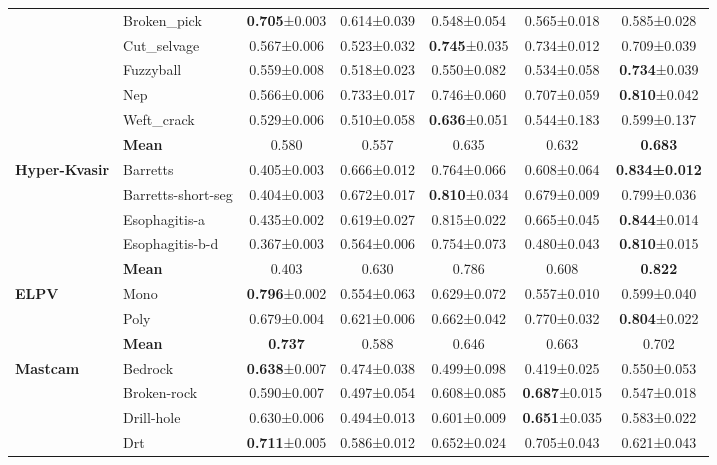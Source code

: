 \documentclass[10pt,journal,compsoc]{IEEEtran}
\begin{document}
\begin{table}[bt]
{\begin{tabular}{l@{}l@{}ccccc}
          & Broken\_pick & \textbf{0.705}±0.003 & 0.614±0.039 & 0.548±0.054 & 0.565±0.018 & 0.585±0.028 \\
          & Cut\_selvage & 0.567±0.006 & 0.523±0.032 & \textbf{0.745}±0.035 & 0.734±0.012 & 0.709±0.039 \\
          & Fuzzyball & 0.559±0.008 & 0.518±0.023 & 0.550±0.082 & 0.534±0.058 & \textbf{0.734}±0.039 \\
          & Nep   & 0.566±0.006 & 0.733±0.017 & 0.746±0.060 & 0.707±0.059 & \textbf{0.810}±0.042 \\
          & Weft\_crack & 0.529±0.006 & 0.510±0.058 & \textbf{0.636}±0.051 & 0.544±0.183 & 0.599±0.137 \\\cline{2-7}
          & \textbf{Mean}  & 0.580 & 0.557 & 0.635 & 0.632 & \textbf{0.683} \\
    \hline
    \multirow{5}[0]{*}{\textbf{Hyper-Kvasir}} & Barretts & 0.405±0.003 & 0.666±0.012 & 0.764±0.066 & 0.608±0.064 & \textbf{0.834±0.012} \\
          & Barretts-short-seg & 0.404±0.003 & 0.672±0.017 & \textbf{0.810}±0.034 & 0.679±0.009 & 0.799±0.036 \\
          & Esophagitis-a & 0.435±0.002 & 0.619±0.027 & 0.815±0.022 & 0.665±0.045 & \textbf{0.844}±0.014 \\
          & Esophagitis-b-d & 0.367±0.003 & 0.564±0.006 & 0.754±0.073 & 0.480±0.043 & \textbf{0.810}±0.015 \\\cline{2-7}
          & \textbf{Mean}  & 0.403 & 0.630 & 0.786 & 0.608 & \textbf{0.822} \\
    \hline
    \multirow{3}[0]{*}{\textbf{ELPV}} & Mono  & \textbf{0.796}±0.002 & 0.554±0.063 & 0.629±0.072 & 0.557±0.010 & 0.599±0.040 \\
          & Poly  & 0.679±0.004 & 0.621±0.006 & 0.662±0.042 & 0.770±0.032 & \textbf{0.804}±0.022 \\\cline{2-7}
          & \textbf{Mean}  & \textbf{0.737} & 0.588 & 0.646 & 0.663 & 0.702 \\
    \hline
    \multirow{10}[0]{*}{\textbf{Mastcam}} & Bedrock & \textbf{0.638}±0.007 & 0.474±0.038 & 0.499±0.098 & 0.419±0.025 & 0.550±0.053 \\
          & Broken-rock & 0.590±0.007 & 0.497±0.054 & 0.608±0.085 & \textbf{0.687}±0.015 & 0.547±0.018 \\
          & Drill-hole & 0.630±0.006 & 0.494±0.013 & 0.601±0.009 & \textbf{0.651}±0.035 & 0.583±0.022 \\
          & Drt   & \textbf{0.711}±0.005 & 0.586±0.012 & 0.652±0.024 & 0.705±0.043 & 0.621±0.043 \\

\end{tabular}}
\end{table}
\end{document}
